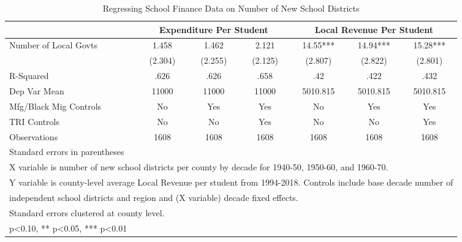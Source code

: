 \begin{table}[htbp]\centering
\def\sym#1{\ifmmode^{#1}\else\(^{#1}\)\fi}
\caption{Regressing School Finance Data on Number of New School Districts}
\begin{tabular}{l*{6}{c}}
\toprule
                &\multicolumn{3}{c}{Expenditure Per Student}&\multicolumn{3}{c}{Local Revenue Per Student}\\\cmidrule(lr){2-4}\cmidrule(lr){5-7}
\midrule
Number of Local Govts&    1.458   &    1.462   &    2.121   &    14.55***&    14.94***&    15.28***\\
                &  (2.304)   &  (2.255)   &  (2.125)   &  (2.807)   &  (2.822)   &  (2.801)   \\
\midrule
R-Squared       &     .626   &     .626   &     .658   &      .42   &     .422   &     .432   \\
Dep Var Mean    &    11000   &    11000   &    11000   & 5010.815   & 5010.815   & 5010.815   \\
Mfg/Black Mig Controls&       No   &      Yes   &      Yes   &       No   &      Yes   &      Yes   \\
TRI Controls    &       No   &       No   &      Yes   &       No   &       No   &      Yes   \\
Observations    &     1608   &     1608   &     1608   &     1608   &     1608   &     1608   \\
\bottomrule
\multicolumn{7}{l}{\footnotesize Standard errors in parentheses}\\
\multicolumn{7}{l}{\footnotesize X variable is number of new school districts per county by decade for 1940-50, 1950-60, and 1960-70.}\\
\multicolumn{7}{l}{\footnotesize Y variable is county-level average Local Revenue per student from 1994-2018. Controls include base decade number of }\\
\multicolumn{7}{l}{\footnotesize independent school districts and region and (X variable) decade fixed effects.}\\
\multicolumn{7}{l}{\footnotesize Standard errors clustered at county level.}\\
\multicolumn{7}{l}{\footnotesize * p<0.10, ** p<0.05, *** p<0.01}\\
\end{tabular}
\end{table}
